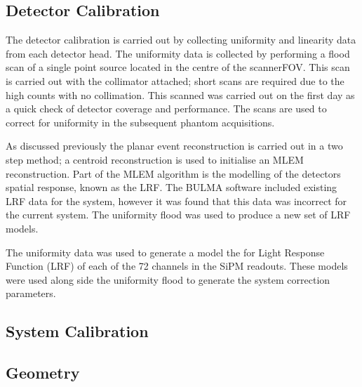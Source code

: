 \subsection{Detector Calibration}
The detector calibration is carried out by collecting uniformity and linearity data from each detector head. The uniformity data is collected by performing a flood scan of a single point source located in the centre of the scanner\acrshort{FOV}. This scan is carried out with the collimator attached; short scans are required due to the high counts with no collimation. This scanned was carried out on the first day as a quick check of detector coverage and performance. The scans are used to correct for uniformity in the subsequent phantom acquisitions. 

As discussed previously the planar event reconstruction is carried out in a two step method; a centroid reconstruction is used to initialise an \acrshort{MLEM} reconstruction. Part of the \acrshort{MLEM} algorithm is the modelling of the detectors spatial response, known as the \acrshort{LRF}. The BULMA software included existing \acrshort{LRF} data for the system, however it was found that this data was incorrect for the current system. The uniformity flood was used to produce a new set of \acrshort{LRF} models. 

The uniformity data was used to generate a model the for
Light Response Function (LRF) of each of the 72 channels
in the SiPM readouts. These models were used along side the
uniformity flood to generate the system correction parameters.

\subsection{System Calibration}
\subsection{Geometry}

